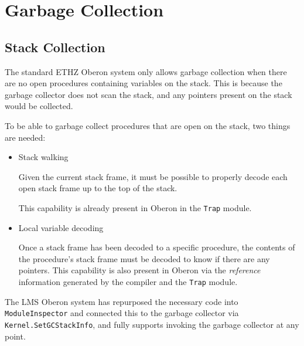 \section{Garbage Collection}

\subsection{Stack Collection}

The standard ETHZ Oberon system only allows garbage collection when
there are no open procedures containing variables on the stack.  This
is because the garbage collector does not scan the stack, and any
pointers present on the stack would be collected.

To be able to garbage collect procedures that are open on the stack,
two things are needed:

\begin{itemize}
\item Stack walking

  Given the current stack frame, it must be possible to properly
  decode each open stack frame up to the top of the stack.

  This capability is already present in Oberon in the \texttt{Trap}
  module.

\item Local variable decoding

  Once a stack frame has been decoded to a specific procedure, the
  contents of the procedure's stack frame must be decoded to know if
  there are any pointers.  This capability is also present in Oberon
  via the \emph{reference} information generated by the compiler and
  the \texttt{Trap} module.
\end{itemize}

The LMS Oberon system has repurposed the necessary code into
\texttt{ModuleInspector} and connected this to the garbage collector
via \texttt{Kernel.SetGCStackInfo}, and fully supports invoking the
garbage collector at any point.

